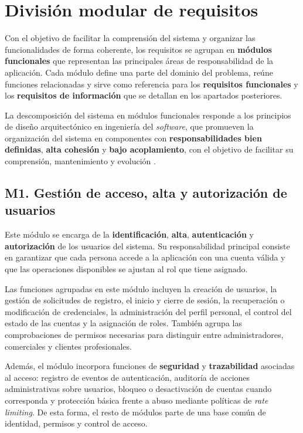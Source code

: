 \section{División modular de requisitos}
\label{sec:ModularRequirements}

Con el objetivo de facilitar la comprensión del sistema y organizar las funcionalidades de forma coherente, los requisitos se agrupan en \textbf{módulos funcionales} que representan las principales áreas de responsabilidad de la aplicación. Cada módulo define una parte del dominio del problema, reúne funciones relacionadas y sirve como referencia para los \textbf{requisitos funcionales} y los \textbf{requisitos de información} que se detallan en los apartados posteriores.

La descomposición del sistema en módulos funcionales responde a los principios de diseño arquitectónico en ingeniería del \textit{software}, que promueven la organización del sistema en componentes con \textbf{responsabilidades bien definidas}, \textbf{alta cohesión} y \textbf{bajo acoplamiento}, con el objetivo de facilitar su comprensión, mantenimiento y evolución \citep[Ch.~6--7]{sommerville}.

\subsection{M1. Gestión de acceso, alta y autorización de usuarios}

Este módulo se encarga de la \textbf{identificación}, \textbf{alta}, \textbf{autenticación} y \textbf{autorización} de los usuarios del sistema. Su responsabilidad principal consiste en garantizar que cada persona accede a la aplicación con una cuenta válida y que las operaciones disponibles se ajustan al rol que tiene asignado.

Las funciones agrupadas en este módulo incluyen la creación de usuarios, la gestión de solicitudes de registro, el inicio y cierre de sesión, la recuperación o modificación de credenciales, la administración del perfil personal, el control del estado de las cuentas y la asignación de roles. También agrupa las comprobaciones de permisos necesarias para distinguir entre administradores, comerciales y clientes profesionales.

Además, el módulo incorpora funciones de \textbf{seguridad} y \textbf{trazabilidad} asociadas al acceso: registro de eventos de autenticación, auditoría de acciones administrativas sobre usuarios, bloqueo o desactivación de cuentas cuando corresponda y protección básica frente a abuso mediante políticas de \textit{rate limiting}. De esta forma, el resto de módulos parte de una base común de identidad, permisos y control de acceso.

